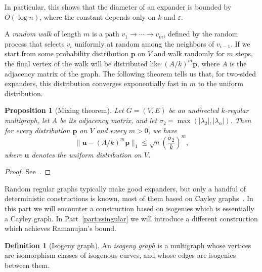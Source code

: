\documentclass[10pt]{article}
\theoremstyle{plain}
\newtheorem{proposition}[theorem]{Proposition}
\theoremstyle{definition}
\newtheorem{definition}[theorem]{Definition}
\begin{document}
\begin{prposition}
In particular, this shows that the diameter of an expander is bounded
by $O(\log n)$, where the constant depends only on $k$ and $ε$. %

A \emph{random walk} of length $m$ is a path $v_1\to\cdots\to v_m$,
defined by the random process that selects $v_i$ uniformly at random
among the neighbors of $v_{i-1}$. %
If we start from some probability distribution $\mathbf{p}$ on $V$ and
walk randomly for $m$ steps, the final vertex of the walk will be
distributed like $(A/k)^m\mathbf{p}$, where $A$ is the adjacency matrix of
the graph. %
The following theorem tells us that, for two-sided expanders, this
distribution converges exponentially fast in $m$ to the uniform
distribution.

\begin{proposition}[Mixing theorem]
  \label{th:mixing}
  Let $G=(V,E)$ be an undirected $k$-regular multigraph, let $A$ be
  its adjacency matrix, and let $σ₂ = \max(|λ_2|, |λ_n|)$.  %
  Then for every distribution $\mathbf{p}$ on $V$ and every $m>0$, we
  have
  \begin{equation*}
    \| \mathbf{u} - (A/k)^m \mathbf{p} \|_1 ≤ \sqrt{n} \left(\frac{σ_2}{k}\right)^m,
  \end{equation*}
  where $\mathbf{u}$ denotes the uniform distribution on $V$.
\end{proposition}
\begin{proof}
  See~\cite[Chap.~21]{trevisan-graphs}.
\end{proof}

Random regular graphs typically make good expanders, but only a
handful of deterministic constructions is known, most of them based on
Cayley
graphs~\cite{LubPS,chung1989diameters,Goldreich2011,trevisan-graphs}. %
In this part we will encounter a construction based on isogenies which
is essentially a Cayley graph. %
In Part~\ref{part:ssingular} we will introduce a different
construction which achieves Ramanujan's bound.

\begin{definition}[Isogeny graph]
  An \emph{isogeny graph} is a multigraph whose vertices are
  isomorphism classes of isogenous curves, and whose edges are
  isogenies between them.
\end{definition}



\end{prposition}
\end{document}
